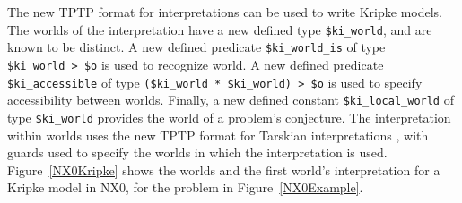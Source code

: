 \documentclass[runningheads]{llncs}
\begin{document}
The new TPTP format for interpretations can be used to write Kripke models.
The worlds of the interpretation have a new defined type {\tt \$ki\_world}, and are 
known to be distinct.
A new defined predicate {\tt \$ki\_world\_is} of type {\tt \$ki\_world~>~\$o} is used to 
recognize world.
A new defined predicate {\tt \$ki\_accessible} of type {\tt (\$ki\_world~*~\$ki\_world)~>~\$o} is
used to specify accessibility between worlds.
Finally, a new defined constant {\tt \$ki\_local\_world} of type {\tt \$ki\_world} provides the 
world of a problem's conjecture. 
The interpretation within worlds uses the new TPTP format for Tarskian interpretations 
\cite{SS+23-LPAR}, with guards used to specify the worlds in which the interpretation is used.
Figure~\ref{NX0Kripke} shows the worlds and the first world's interpretation for a Kripke
model in NX0, for the problem in Figure~\ref{NX0Example}.
\end{document}
